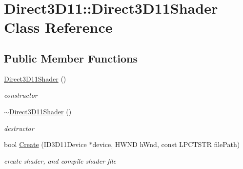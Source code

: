 \hypertarget{class_direct3_d11_1_1_direct3_d11_shader}{}\section{Direct3\+D11\+:\+:Direct3\+D11\+Shader Class Reference}
\label{class_direct3_d11_1_1_direct3_d11_shader}
\subsection*{Public Member Functions}
\begin{DoxyCompactItemize}
\item 
\mbox{\label{class_direct3_d11_1_1_direct3_d11_shader_aa1d933ca80d202cdd6924b5483d1abc1}} 
\mbox{\hyperlink{class_direct3_d11_1_1_direct3_d11_shader_aa1d933ca80d202cdd6924b5483d1abc1}{Direct3\+D11\+Shader}} ()
\begin{DoxyCompactList}\small\item\em constructor \end{DoxyCompactList}\item 
\mbox{\label{class_direct3_d11_1_1_direct3_d11_shader_a8b389523c00a6c96880042b90e6dc424}} 
\mbox{\hyperlink{class_direct3_d11_1_1_direct3_d11_shader_a8b389523c00a6c96880042b90e6dc424}{$\sim$\+Direct3\+D11\+Shader}} ()
\begin{DoxyCompactList}\small\item\em destructor \end{DoxyCompactList}\item 
\mbox{\label{class_direct3_d11_1_1_direct3_d11_shader_a609dc00639ccf89614b5605251f5cf8d}} 
bool \mbox{\hyperlink{class_direct3_d11_1_1_direct3_d11_shader_a609dc00639ccf89614b5605251f5cf8d}{Create}} (I\+D3\+D11\+Device $\ast$device, H\+W\+ND h\+Wnd, const L\+P\+C\+T\+S\+TR file\+Path)
\begin{DoxyCompactList}\small\item\em create shader, and compile shader file \end{DoxyCompactList}\item 
\mbox{\label{class_direct3_d11_1_1_direct3_d11_shader_afaa2962ffbeff81b22f70b1386fe7426}} 

\end{DoxyCompactItemize}
